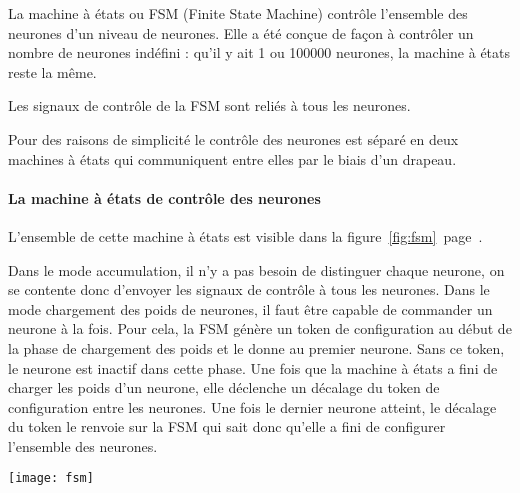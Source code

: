 La machine à états ou FSM (Finite State Machine) contrôle l'ensemble des neurones
d'un niveau de neurones.
Elle a été conçue de façon à contrôler un nombre de neurones indéfini : qu'il y
ait 1 ou 100000 neurones, la machine à états reste la même.

Les signaux de contrôle de la FSM sont reliés à tous les neurones.

Pour des raisons de simplicité le contrôle des neurones est séparé en deux
machines à états qui communiquent entre elles par le biais d'un drapeau.

\paragraph{La machine à états de contrôle des neurones\\}

L'ensemble de cette machine à états est visible dans la
figure~\ref{fig:fsm}~page~\pageref{fig:fsm}.

Dans le mode accumulation,
il n'y a pas besoin de distinguer chaque neurone, on se contente donc d'envoyer
les signaux de contrôle à tous les neurones.
Dans le mode chargement des poids de neurones, il faut être capable de commander
un neurone à la fois. Pour cela, la FSM génère un token de configuration au début
de la phase de chargement des poids et le donne au premier neurone. Sans ce token,
le neurone est inactif dans cette phase. Une fois que la machine à états a fini de
charger les poids d'un neurone, elle déclenche un décalage du token de configuration
entre les neurones. Une fois le dernier neurone atteint, le décalage du token
le renvoie sur la FSM qui sait donc qu'elle a fini de configurer l'ensemble des
neurones.

\begin{sidewaysfigure}
	\texttt{[image: fsm]}
	\caption{Machine à états de contrôle des neurones}
	\label{fig:fsm}
\end{sidewaysfigure}

